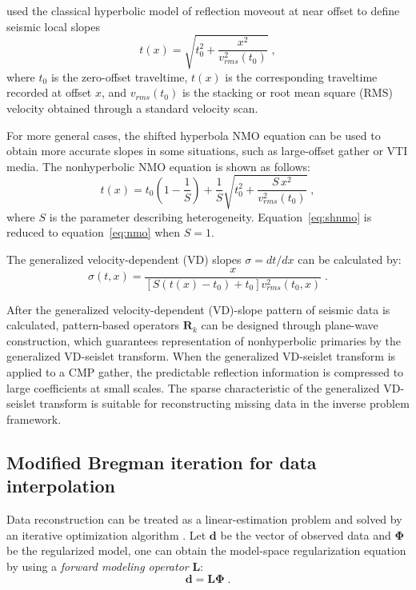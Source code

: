 \cite{Liu15} used the classical hyperbolic model of
reflection moveout at near offset to define seismic local slopes
\begin{equation}
  \label{eq:nmo} t(x) = \sqrt{t_0^2 + \frac{x^2}{v_{rms}^2(t_0)}}\;,
\end{equation}
where $t_0$ is the zero-offset traveltime, $t(x)$ is the corresponding
traveltime recorded at offset $x$, and $v_{rms}(t_0)$ is the stacking
or root mean square (RMS) velocity obtained through a standard
velocity scan.

For more general cases, the shifted hyperbola NMO
equation \cite[]{Malovichko78,Castle94,Fomel01b} can be used to obtain
more accurate slopes in some situations, such as large-offset gather
or VTI media. The nonhyperbolic NMO equation is shown as follows:
\begin{equation}
  \label{eq:shnmo}
  t(x) = t_0(1-\frac{1}{S})+\frac{1}{S}\sqrt{t_0^2 + \frac{S\,x^2}{v_{rms}^2(t_0)}}\;,
\end{equation}
where $S$ is the parameter describing
heterogeneity. Equation~\ref{eq:shnmo} is reduced to
equation~\ref{eq:nmo} when $S=1$.

The generalized velocity-dependent (VD) slopes $\sigma=
dt/dx$ can be calculated by:
\begin{equation}
  {\sigma(t,x)} = {\frac{x}{[S(t(x)-t_0)+t_0]v_{rms}^2(t_0,x)}}\;.
  \label{eq:shslo}
\end{equation}

After the generalized velocity-dependent (VD)-slope pattern of seismic
data is calculated, pattern-based operators $\mathbf{R}_k$ can be
designed through plane-wave construction, which guarantees
representation of nonhyperbolic primaries by the generalized
VD-seislet transform. When the generalized VD-seislet transform is
applied to a CMP gather, the predictable reflection information is
compressed to large coefficients at small scales. The sparse
characteristic of the generalized VD-seislet transform is suitable for
reconstructing missing data in the inverse problem framework.

\subsection{Modified Bregman iteration for data interpolation}
Data reconstruction can be treated as a linear-estimation problem and
solved by an iterative optimization algorithm \cite[]{Fomel03}.  Let
$\mathbf{d}$ be the vector of observed data and $\mathbf{\Phi}$ be the
regularized model, one can obtain the model-space
regularization equation by using a \emph{forward modeling operator}
$\mathbf{L}$:
\begin{equation}
  \label{eq:inter1}
  \mathbf{d} = \mathbf{L} \mathbf{\Phi} \;.
\end{equation}

